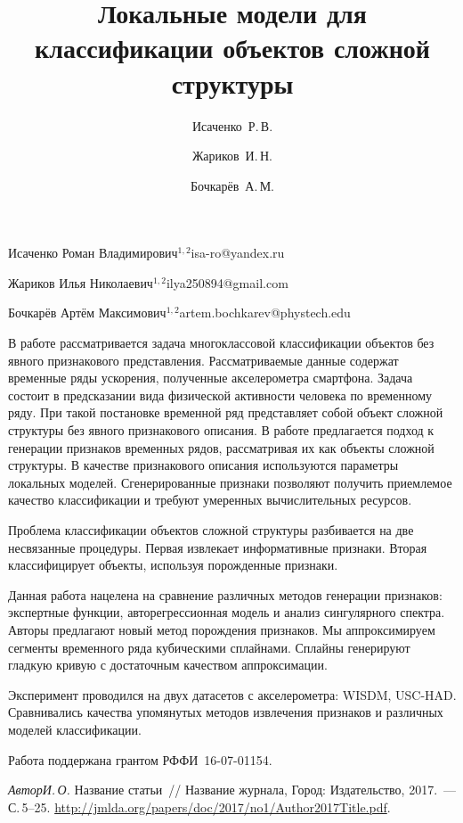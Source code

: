 \documentclass[twoside]{article}
\begin{document}
\Russian
\title{Локальные модели для классификации объектов сложной структуры}
\author{Исаченко~Р.\,В.}{Исаченко Роман Владимирович$^{1, 2}$}{isa-ro@yandex.ru}
\author{Жариков~И.\,Н.}{Жариков Илья Николаевич$^{1, 2}$}{ilya250894@gmail.com}
\author{Бочкарёв~А.\,М.}{Бочкарёв Артём Максимович$^{1, 2}$\speaker}{artem.bochkarev@phystech.edu}
\maketitle

В работе рассматривается задача многоклассовой классификации объектов без явного признакового представления. 
Рассматриваемые данные содержат временные ряды ускорения, полученные акселерометра смартфона.
Задача состоит в предсказании вида физической активности человека по временному ряду.
При такой постановке временной ряд представляет собой объект сложной структуры без явного признакового описания.
В работе предлагается подход к генерации признаков временных рядов, рассматривая их как объекты сложной структуры.
В качестве признакового описания используются параметры локальных моделей.
Сгенерированные признаки позволяют получить приемлемое качество классификации и требуют умеренных вычислительных ресурсов.

Проблема классификации объектов сложной структуры разбивается на две несвязанные процедуры.
Первая извлекает информативные признаки. 
Вторая классифицирует объекты, используя порожденные признаки.

Данная работа нацелена на сравнение различных методов генерации признаков: экспертные функции, авторегрессионная модель и анализ сингулярного спектра.
Авторы предлагают новый метод порождения признаков.
Мы аппроксимируем сегменты временного ряда кубическими сплайнами. 
Сплайны генерируют гладкую кривую с достаточным качеством аппроксимации.

Эксперимент проводился на двух датасетов с акселерометра: WISDM, USC-HAD. 
Сравнивались качества упомянутых методов извлечения признаков и различных моделей классификации.

Работа поддержана грантом РФФИ \No\,16-07-01154.

\begin{thebibliography}{1}
    \emph{Автор\;И.\,О.}
    Название статьи~//
    Название журнала,
    Город: Издательство, 2017.~--- С.\,5--25. %
    \url{http://jmlda.org/papers/doc/2017/no1/Author2017Title.pdf}.
\end{thebibliography}
\end{document}
